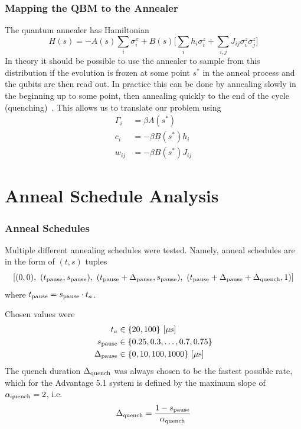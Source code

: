 \documentclass{beamer}
\begin{document}
\begin{frame}
    \frametitle{Mapping the QBM to the Annealer}
    The quantum annealer has Hamiltonian
    \[
        H(s) = -A(s) \sum_i \sigma_i^x + B(s) \bigg[ \sum_i h_i \sigma_i^z + \sum_{i,j} J_{ij} \sigma_i^z \sigma_j^z \bigg]
    \]
    In theory it should be possible to use the annealer to sample from this distribution if the evolution is frozen at some point \( s^* \) in the anneal process and the qubits are then read out. In practice this can be done by annealing slowly in the beginning up to some point, then annealing quickly to the end of the cycle (quenching)~\cite{amin_2018}.
    This allows us to translate our problem using
    \begin{align*}
        \Gamma_i
            &= \beta A(s^*) \\
        c_i
            &= -\beta B(s^*) h_i \\
        w_{ij}
            &= -\beta B(s^*) J_{ij}
    \end{align*}
\end{frame}


\section{Anneal Schedule Analysis}

\begin{frame}
    \frametitle{Anneal Schedules}
    Multiple different annealing schedules were tested.
    Namely, anneal schedules are in the form of \( (t, s) \) tuples
    \[
        [(0, 0), \ (\tpause, \spause), \ (\tpause + \Deltapause, \spause), \ (\tpause + \Deltapause + \Deltaquench, 1)]
    \]
    where \( t_{\text{pause}} = s_{\text{pause}} \cdot t_a \).

    Chosen values were
    \begin{align*}
        t_a
            &\in \{20, 100\} \ [\mu\text{s}] \\
        s_{\text{pause}}
            &\in \{0.25, 0.3, \dots, 0.7, 0.75\} \\
        \Delta_{\text{pause}}
            &\in \{0, 10, 100, 1000\} \ [\mu\text{s}]
    \end{align*}
    The quench duration \( \Delta_{\text{quench}} \) was always chosen to be the fastest possible rate, which for the Advantage 5.1 system is defined by the maximum slope of \( \alpha_{\text{quench}} = 2 \), i.e.
    \[
        \Delta_{\text{quench}} = \frac{1 - s_{\text{pause}}}{\alpha_{\text{quench}}}
    \]
\end{frame}
\end{document}
